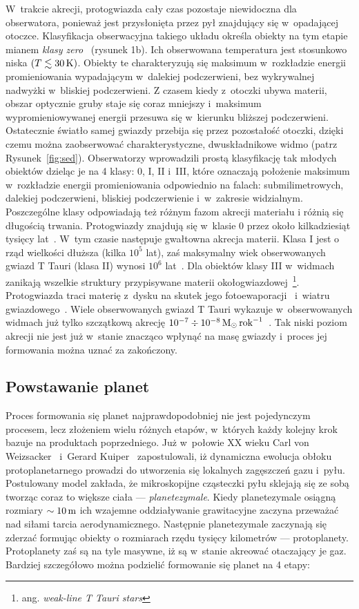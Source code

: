 W~trakcie akrecji, protogwiazda cały czas pozostaje niewidoczna dla obserwatora,
ponieważ jest przysłonięta przez pył znajdujący się w~opadającej otoczce.
Klasyfikacja obserwacyjna takiego układu określa obiekty na tym etapie mianem
\emph{klasy zero}~\cite{andre} (rysunek 1b). Ich obserwowana temperatura jest
stosunkowo niska $(T \lesssim 30\hbox{$\thinspace\textrm{K}$})$. Obiekty te charakteryzują się maksimum
w~rozkładzie energii promieniowania wypadającym w~dalekiej podczerwieni, bez
wykrywalnej nadwyżki w~bliskiej podczerwieni. Z czasem kiedy z~otoczki ubywa
materii, obszar optycznie gruby staje się coraz mniejszy i~maksimum
wypromieniowywanej energii przesuwa się w~kierunku bliższej podczerwieni.
Ostatecznie światło samej gwiazdy przebija się przez pozostałość otoczki, dzięki
czemu można zaobserwować charakterystyczne, dwuskładnikowe widmo (patrz
Rysunek~\ref{fig:sed}). Obserwatorzy wprowadzili prostą klasyfikację tak młodych
obiektów dzieląc je na 4 klasy: 0, I, II i~III, które oznaczają położenie
maksimum w~rozkładzie energii promieniowania odpowiednio na falach:
submilimetrowych, dalekiej podczerwieni, bliskiej podczerwienie i~w~zakresie
widzialnym. Poszczególne klasy odpowiadają też różnym fazom akrecji materiału i
różnią się długością trwania. Protogwiazdy znajdują się w~klasie 0 przez około
kilkadziesiąt tysięcy lat~\cite{FSSK06}. W~tym czasie następuje gwałtowna
akrecja materii.  Klasa I jest o rząd wielkości dłuższa (kilka $10^5$ lat), zaś
maksymalny wiek obserwowanych gwiazd T Tauri (klasa II) wynosi $10^6$
lat~\cite{HCGD98}.  Dla obiektów klasy III w~widmach zanikają wszelkie struktury
przypisywane materii okołogwiazdowej~\footnote{ang. \emph{weak-line T Tauri
stars}}.  Protogwiazda traci materię z~dysku na skutek jego
fotoewaporacji~\cite{ACP06} i~wiatru gwiazdowego~\cite{PN86}. Wiele
obserwowanych gwiazd T Tauri wykazuje w~obserwowanych widmach już tylko
szczątkową akrecję $10^{-7} \div 10^{-8} \hbox{$\mathrm{\thinspace M_{\odot}}$}\hbox{$\thinspace\textrm{rok}$}^{-1}$~\cite{Hart98}. Tak niski
poziom akrecji nie jest już w~stanie znacząco wpłynąć na masę gwiazdy i~proces
jej formowania można uznać za zakończony.

\subsection{Powstawanie planet}

Proces formowania się planet najprawdopodobniej nie jest pojedynczym procesem,
lecz złożeniem wielu różnych etapów, w~których każdy kolejny krok bazuje na
produktach poprzedniego. Już w~połowie XX wieku Carl von
Weizsacker~\cite*{1943ZA.....22..319W} i~Gerard
Kuiper~\cite*{1951PNAS...37....1K} zapostulowali, iż dynamiczna ewolucja obłoku
protoplanetarnego prowadzi do utworzenia się lokalnych zagęszczeń gazu i~pyłu.
Postulowany model zakłada, że mikroskopijne cząsteczki pyłu sklejają się ze sobą
tworząc coraz to większe ciała --- \emph{planetezymale}. Kiedy planetezymale
osiągną rozmiary $\sim 10\hbox{$\thinspace\textrm{m}$}$ ich wzajemne oddziaływanie grawitacyjne zaczyna
przeważać nad siłami tarcia aerodynamicznego. Następnie planetezymale zaczynają
się zderzać formując obiekty o rozmiarach rzędu tysięcy kilometrów ---
protoplanety. Protoplanety zaś są na tyle masywne, iż są w~stanie akreować
otaczający je gaz. Bardziej szczegółowo można podzielić formowanie się planet na
4 etapy:

